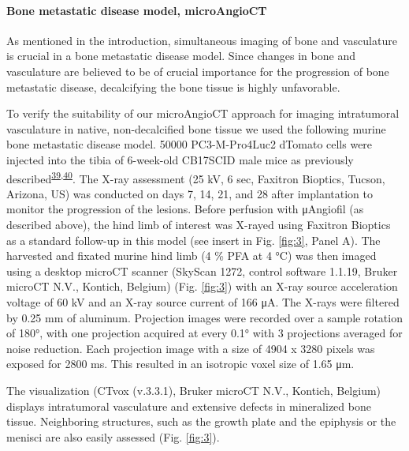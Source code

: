 \hypertarget{bone-metastatic-disease-model-microangioct}{%
\paragraph{Bone metastatic disease model, microAngioCT}\label{bone-metastatic-disease-model-microangioct}}

As mentioned in the introduction, simultaneous imaging of bone and vasculature is crucial in a bone metastatic disease model.
Since changes in bone and vasculature are believed to be of crucial importance for the progression of bone metastatic disease, decalcifying the bone tissue is highly unfavorable.

To verify the suitability of our microAngioCT approach for imaging intratumoral vasculature in native, non-decalcified bone tissue we used the following murine bone metastatic disease model.
50000 PC3-M-Pro4Luc2 dTomato cells were injected into the tibia of 6-week-old CB17SCID male mice as previously described\textsuperscript{\protect\hyperlink{ref-C9ratYNO}{39},\protect\hyperlink{ref-16lhxZOpa}{40}}.
The X-ray assessment (25 kV, 6 sec, Faxitron Bioptics, Tucson, Arizona, US) was conducted on days 7, 14, 21, and 28 after implantation to monitor the progression of the lesions.
Before perfusion with μAngiofil (as described above), the hind limb of interest was X-rayed using Faxitron Bioptics as a standard follow-up in this model (see insert in Fig. \ref{fig:3}, Panel A).
The harvested and fixated murine hind limb (4 \% PFA at 4 °C) was then imaged using a desktop microCT scanner (SkyScan 1272, control software 1.1.19, Bruker microCT N.V., Kontich, Belgium) (Fig. \ref{fig:3}) with an X-ray source acceleration voltage of 60 kV and an X-ray source current of 166 μA.
The X-rays were filtered by 0.25 mm of aluminum.
Projection images were recorded over a sample rotation of 180°, with one projection acquired at every 0.1° with 3 projections averaged for noise reduction.
Each projection image with a size of 4904 x 3280 pixels was exposed for 2800 ms.
This resulted in an isotropic voxel size of 1.65 μm.

The visualization (CTvox (v.3.3.1), Bruker microCT N.V., Kontich, Belgium) displays intratumoral vasculature and extensive defects in mineralized bone tissue.
Neighboring structures, such as the growth plate and the epiphysis or the menisci are also easily assessed (Fig. \ref{fig:3}).

